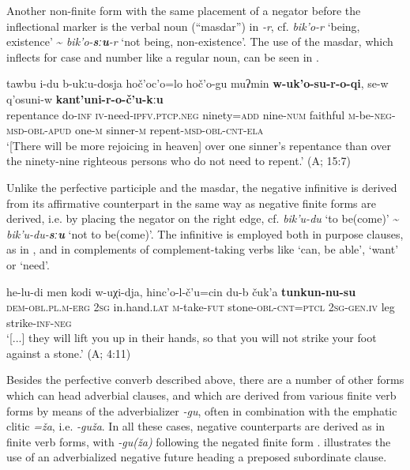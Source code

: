 \documentclass[output=paper,colorlinks=true, citecolor=brown]{langscibook}
\begin{document}
Another non-finite form with the same placement of a negator before the inflectional marker is the verbal noun (“masdar”) in \textit{{}-r}, cf. \textit{bik’o-r} ‘being, existence’ {\textasciitilde} \textit{bik’o-}\textbf{\textit{sːu}}\textit{{}-r} ‘not being, non-existence’. The use of the masdar, which inflects for case and number like a regular noun, can be seen in .

\ea
    \label{ex:and:35} 
    \gll tawbu i{}-du b{}-ukːu{}-dosja hoč’oc’o=lo hoč’o{}-gu  muʔmin \textbf{w-uk’o-su-r-o-qi}, se-w q’osuni-w \textbf{kant’uni{}-r{}-o{}-č’u{}-kːu} \\
          repentance do{}-\textsc{inf} \textsc{iv}{}-need\textsc{{}-ipfv.ptcp.neg} ninety=\textsc{add} nine-\textsc{num}  faithful \textsc{m}{}-be\textsc{{}-neg-msd-obl-apud} one-\textsc{m} sinner{}-\textsc{m} repent-\textsc{msd{}-obl{}-cnt-ela} \\
    \glt ‘[There will be more rejoicing in heaven] over one sinner’s repentance than over the ninety-nine righteous persons who do not need to repent.’ (A;  15:7)
\z 

Unlike the perfective participle and the masdar, the negative infinitive is derived from its affirmative counterpart in the same way as negative finite forms are derived, i.e. by placing the negator on the right edge, cf. \textit{bik’u-du} ‘to be(come)’ {\textasciitilde} \textit{bik’u-du-}\textbf{\textit{sːu}} ‘not to be(come)’. The infinitive is employed both in purpose clauses, as in , and in complements of complement-taking verbs like ‘can, be able’, ‘want’ or ‘need’.

\ea
    \label{ex:and:36} %
    \gll [...] he{}-lu{}-di men kodi w{}-uχi{}-dja, hinc’o{}-l{}-č’u=cin du{}-b čuk’a \textbf{tunkun{}-nu{}-su} \\
          {} \textsc{dem-obl.pl.m{}-erg} \textsc{2sg} in.hand.\textsc{lat} \textsc{m}{}-take-\textsc{fut} stone\textsc{{}-obl}{}-\textsc{cnt=ptcl} \textsc{2sg}{}-\textsc{gen.iv} leg strike-\textsc{inf-neg} \\
    \glt ‘[...] they will lift you up in their hands, so that you will not strike your foot against a stone.’ (A;  4:11)
\z 

Besides the perfective converb described above, there are a number of other forms which can head adverbial clauses, and which are derived from various finite verb forms by means of the adverbializer \textit{{}-gu}, often in combination with the emphatic clitic \textit{=ža}, i.e. \textit{{}-guža}. In all these cases, negative counterparts are derived as in finite verb forms, with \textit{{}-gu(ža)} following the negated finite form \citep{Maisak2022}.  illustrates the use of an adverbialized negative future heading a preposed subordinate clause.
\end{document}
